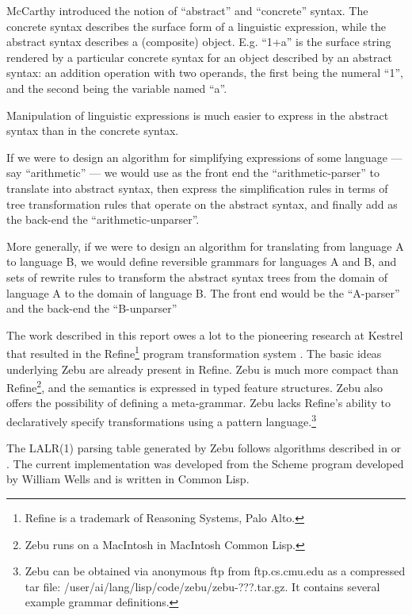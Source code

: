 McCarthy introduced the notion of ``abstract'' and ``concrete''
syntax.  The concrete syntax describes the surface form of a
linguistic expression, while the abstract syntax describes a
(composite) object. E.g. ``1+a'' is the surface string rendered by a
particular concrete syntax for an object described by an abstract
syntax: an addition operation with two operands, the first being the
numeral ``1'', and the second being the variable named ``a''.

Manipulation of linguistic expressions is much easier to express in
the abstract syntax than in the concrete syntax.  

If we were to design an algorithm for simplifying expressions of some
language --- say ``arithmetic'' --- we would use as the front end the
``arithmetic-parser'' to translate into abstract syntax, then express
the simplification rules in terms of tree transformation rules that
operate on the abstract syntax, and finally add as the back-end the
``arithmetic-unparser''.

More generally, if we were to design an algorithm for translating
from language A to language B, we would define reversible grammars for
languages A and B, and sets of rewrite rules to transform the abstract
syntax trees from the domain of language A to the domain of language
B.  The front end would be the ``A-parser'' and the back-end the
``B-unparser''

The work described in this report owes a lot to the pioneering research
at Kestrel \cite{ap:smith85} that resulted in the {\sf
Refine}\footnote{{\sf Refine} is a trademark of Reasoning Systems,
Palo Alto.} program transformation system \cite{refine}.  The basic
ideas underlying {\sf Zebu} are already present in {\sf Refine}.  {\sf
Zebu} is much more compact than {\sf Refine}\footnote{{\sf Zebu} runs
on a MacIntosh in MacIntosh Common Lisp.}, and the semantics is
expressed in typed feature structures.  {\sf Zebu} also offers the
possibility of defining a meta-grammar.  {\sf
Zebu} lacks {\sf Refine}'s ability to declaratively specify
transformations using a pattern language.\footnote{{\sf Zebu} can be
obtained via anonymous ftp from ftp.cs.cmu.edu as a compressed tar
file: /user/ai/lang/lisp/code/zebu/zebu-???.tar.gz.  It contains
several example grammar definitions.}

The LALR(1) parsing table generated by {\sf Zebu} follows algorithms
described in \cite{aho:79} or \cite{compiler:88}. The current
implementation was developed from the {\sf Scheme} program developed by
William Wells and is written in {\sf Common Lisp}.

